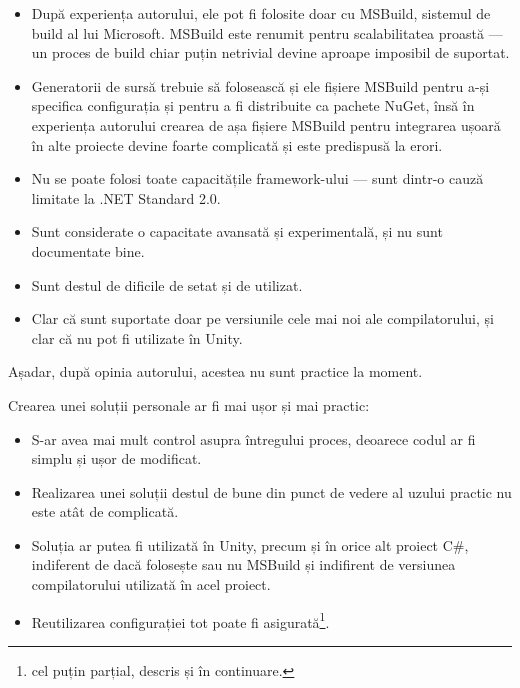 \documentclass[a4paper,12pt]{report}
\begin{document}
\begin{itemize}

  \item După experiența autorului, ele pot fi folosite doar cu MSBuild, sistemul de build al lui Microsoft.
  MSBuild este renumit pentru scalabilitatea proastă --- un proces de build chiar puțin netrivial devine aproape imposibil de suportat.

  \item Generatorii de sursă trebuie să folosească și ele fișiere MSBuild pentru a-și specifica configurația\cite{source_generators_msbuild_configuration} și pentru a fi distribuite ca pachete NuGet,
    însă în experiența autorului crearea de așa fișiere MSBuild pentru integrarea ușoară în alte proiecte devine foarte complicată și este predispusă la erori.

  \item Nu se poate folosi toate capacitățile framework-ului --- sunt dintr-o cauză limitate la {{.}NET} Standard 2.0.

  \item Sunt considerate o capacitate avansată și experimentală, și nu sunt documentate bine.

  \item Sunt destul de dificile de setat și de utilizat.

  \item Clar că sunt suportate doar pe versiunile cele mai noi ale compilatorului, și clar că nu pot fi utilizate în Unity.

\end{itemize}

Așadar, după opinia autorului, acestea nu sunt practice la moment.

Crearea unei soluții personale ar fi mai ușor și mai practic:

\begin{itemize}
  \item S-ar avea mai mult control asupra întregului proces, deoarece codul ar fi simplu și ușor de modificat.

  \item Realizarea unei soluții destul de bune din punct de vedere al uzului practic nu este atât de complicată.

  \item Soluția ar putea fi utilizată în Unity, precum și în orice alt proiect C\#, indiferent de dacă folosește sau nu MSBuild și indifirent de versiunea compilatorului utilizată în acel proiect.

  \item Reutilizarea configurației tot poate fi asigurată\footnote{cel puțin parțial, descris și în continuare.}.
\end{itemize}
\end{document}
